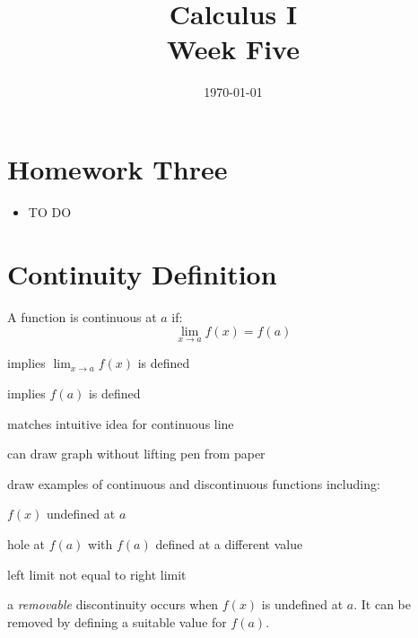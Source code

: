 \documentclass[letterpaper, landscape]{exam}
\author{}
\date{\today}
\title{Calculus I \\ Week Five}
\begin{document}
  \maketitle
  \tableofcontents

  \section{Homework Three} 
  \begin{itemize}
    \item TO DO
  \end{itemize}

  \section{Continuity Definition}

  A function is continuous at $a$ if:
  \[
    \lim_{x \to a} f(x) = f(a) 
  \]

  \begin{itemize*}
    \item implies $\lim_{x \to a} f(x)$ is defined
    \item implies $f(a)$ is defined
    \item matches intuitive idea for continuous line
    \item can draw graph without lifting pen from paper
    \item draw examples of continuous and discontinuous functions including:
      \begin{itemize*}
        \item $f(x)$ undefined at $a$
        \item hole at $f(a)$ with $f(a)$ defined at a different value
        \item left limit not equal to right limit
      \end{itemize*}

    \item a {\em removable} discontinuity occurs when $f(x)$ is undefined at $a$. It can
      be removed by defining a suitable value for $f(a)$.

  \end{itemize*}
\end{document}
